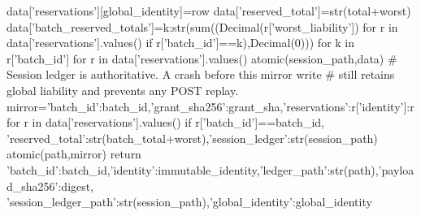             data['reservations'][global_identity]=row
            data['reserved_total']=str(total+worst)
            data['batch_reserved_totals']={k:str(sum((Decimal(r['worst_liability']) for r in data['reservations'].values() if r['batch_id']==k),Decimal(0)))
                for k in {r['batch_id'] for r in data['reservations'].values()}}
            atomic(session_path,data)
            # Session ledger is authoritative. A crash before this mirror write
            # still retains global liability and prevents any POST replay.
            mirror={'batch_id':batch_id,'grant_sha256':grant_sha,'reservations':{r['identity']:r for r in data['reservations'].values() if r['batch_id']==batch_id},
                'reserved_total':str(batch_total+worst),'session_ledger':str(session_path)}
            atomic(path,mirror)
        return {'batch_id':batch_id,'identity':immutable_identity,'ledger_path':str(path),'payload_sha256':digest,
                'session_ledger_path':str(session_path),'global_identity':global_identity}

